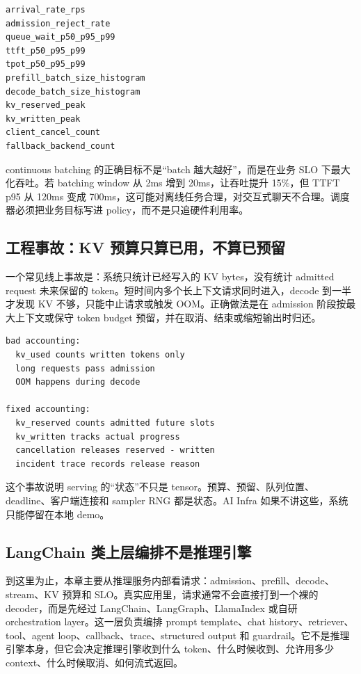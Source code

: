 \begin{lstlisting}[numbers=none,caption={SLO 验收字段}]
arrival_rate_rps
admission_reject_rate
queue_wait_p50_p95_p99
ttft_p50_p95_p99
tpot_p50_p95_p99
prefill_batch_size_histogram
decode_batch_size_histogram
kv_reserved_peak
kv_written_peak
client_cancel_count
fallback_backend_count
\end{lstlisting}

continuous batching 的正确目标不是“batch 越大越好”，而是在业务 SLO 下最大化吞吐。若 batching window 从 2ms 增到 20ms，让吞吐提升 15\%，但 TTFT p95 从 120ms 变成 700ms，这可能对离线任务合理，对交互式聊天不合理。调度器必须把业务目标写进 policy，而不是只追硬件利用率。

\subsection{工程事故：KV 预算只算已用，不算已预留}

一个常见线上事故是：系统只统计已经写入的 KV bytes，没有统计 admitted request 未来保留的 token。短时间内多个长上下文请求同时进入，decode 到一半才发现 KV 不够，只能中止请求或触发 OOM。正确做法是在 admission 阶段按最大上下文或保守 token budget 预留，并在取消、结束或缩短输出时归还。

\begin{lstlisting}[numbers=none,caption={KV 预算事故复盘}]
bad accounting:
  kv_used counts written tokens only
  long requests pass admission
  OOM happens during decode

fixed accounting:
  kv_reserved counts admitted future slots
  kv_written tracks actual progress
  cancellation releases reserved - written
  incident trace records release reason
\end{lstlisting}

这个事故说明 serving 的“状态”不只是 tensor。预算、预留、队列位置、deadline、客户端连接和 sampler RNG 都是状态。AI Infra 如果不讲这些，系统只能停留在本地 demo。

\subsection{LangChain 类上层编排不是推理引擎}

到这里为止，本章主要从推理服务内部看请求：admission、prefill、decode、stream、KV 预算和 SLO。真实应用里，请求通常不会直接打到一个裸的 decoder，而是先经过 LangChain、LangGraph、LlamaIndex 或自研 orchestration layer。这一层负责编排 prompt template、chat history、retriever、tool、agent loop、callback、trace、structured output 和 guardrail。它不是推理引擎本身，但它会决定推理引擎收到什么 token、什么时候收到、允许用多少 context、什么时候取消、如何流式返回。

